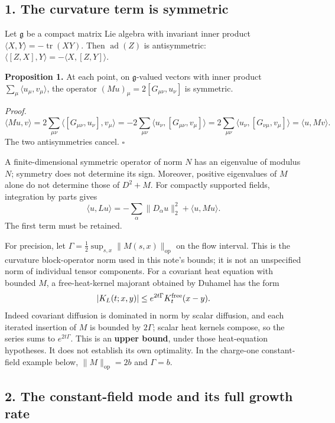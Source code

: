 \documentclass[11pt,a4paper]{article}
\begin{document}
\subsection{1. The curvature term is
symmetric}\label{the-curvature-term-is-symmetric}

Let \(\mathfrak g\) be a compact matrix Lie algebra with invariant inner
product \(\langle X,Y\rangle=-\operatorname{tr}(XY)\). Then
\(\operatorname{ad}(Z)\) is antisymmetric:
\(\langle[Z,X],Y\rangle=-\langle X,[Z,Y]\rangle\).

\textbf{Proposition 1.} At each point, on \(\mathfrak g\)-valued vectors
with inner product \(\sum_\mu\langle u_\mu,v_\mu\rangle\), the operator
\((Mu)_\mu=2[G_{\mu\nu},u_\nu]\) is symmetric.

\emph{Proof.} \[\langle Mu,v\rangle
=2\sum_{\mu\nu}\langle[G_{\mu\nu},u_\nu],v_\mu\rangle
=-2\sum_{\mu\nu}\langle u_\nu,[G_{\mu\nu},v_\mu]\rangle
=2\sum_{\mu\nu}\langle u_\nu,[G_{\nu\mu},v_\mu]\rangle
=\langle u,Mv\rangle.\] The two antisymmetries cancel. \(\square\)

A finite-dimensional symmetric operator of norm \(N\) has an eigenvalue
of modulus \(N\); symmetry does not determine its sign. Moreover,
positive eigenvalues of \(M\) alone do not determine those of \(D^2+M\).
For compactly supported fields, integration by parts gives
\[\langle u,Lu\rangle=-\sum_\alpha\|D_\alpha u\|_2^2
+\langle u,Mu\rangle.\] The first term must be retained.

For precision, let \(\Gamma=\frac12\sup_{s,x}\|M(s,x)\|_{\mathrm{op}}\)
on the flow interval. This is the curvature block-operator norm used in
this note's bounds; it is not an unspecified norm of individual tensor
components. For a covariant heat equation with bounded \(M\), a
free-heat-kernel majorant obtained by Duhamel has the form
\[|K_L(t;x,y)|\le e^{2t\Gamma}K_t^{\rm free}(x-y).\] Indeed covariant
diffusion is dominated in norm by scalar diffusion, and each iterated
insertion of \(M\) is bounded by \(2\Gamma\); scalar heat kernels
compose, so the series sums to \(e^{2t\Gamma}\). This is an
\textbf{upper bound}, under those heat-equation hypotheses. It does not
establish its own optimality. In the charge-one constant-field example
below, \(\|M\|_{\mathrm{op}}=2b\) and \(\Gamma=b\).

\subsection{2. The constant-field mode and its full growth
rate}\label{the-constant-field-mode-and-its-full-growth-rate}
\end{document}
